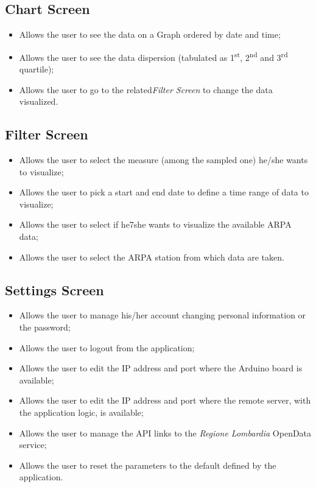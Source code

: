 \subsection{Chart Screen}
\begin{itemize}
    \item Allows the user to see the data on a Graph ordered by date and time;
    \item Allows the user to see the data dispersion (tabulated as 1\textsuperscript{st}, 2\textsuperscript{nd} and 3\textsuperscript{rd} quartile);
    \item Allows the user to go to the related\textit{Filter Screen} to change the data visualized.
\end{itemize}
    
\subsection{Filter Screen}
\begin{itemize}
    \item Allows the user to select the measure (among the sampled one) he/she wants to visualize;
    \item Allows the user to pick a start and end date to define a time range of data to visualize;
    \item Allows the user to select if he7she wants to visualize the available ARPA data;
    \item Allows the user to select the ARPA station from which data are taken.
\end{itemize}
    
\subsection{Settings Screen}
\begin{itemize}
    \item Allows the user to manage his/her account changing personal information or the password;
    \item Allows the user to logout from the application;
    \item Allows the user to edit the IP address and port where the Arduino board is available;
    \item Allows the user to edit the IP address and port where the remote server, with the application logic, is available;
    \item Allows the user to manage the API links to the \textit{Regione Lombardia} OpenData service;
    \item Allows the user to reset the parameters to the default defined by the application.
\end{itemize}

